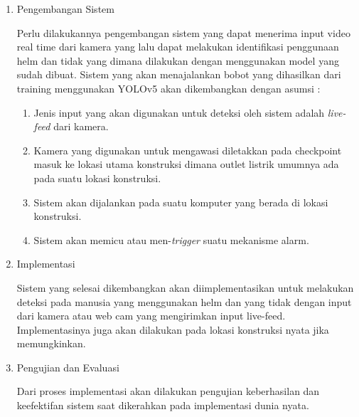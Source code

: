 \begin{enumerate}
  \item Pengembangan Sistem
  \par Perlu dilakukannya pengembangan sistem yang dapat menerima input video real time dari kamera yang lalu dapat melakukan identifikasi penggunaan helm dan tidak yang dimana dilakukan
  dengan menggunakan model yang sudah dibuat. Sistem yang akan menajalankan bobot yang dihasilkan dari training menggunakan YOLOv5 akan dikembangkan dengan asumsi :
  \begin{enumerate}
    \item Jenis input yang akan digunakan untuk deteksi oleh sistem adalah \emph{live-feed} dari kamera.
    \item Kamera yang digunakan untuk mengawasi diletakkan pada checkpoint masuk ke lokasi utama konstruksi dimana outlet listrik umumnya ada pada suatu lokasi konstruksi.
    \item Sistem akan dijalankan pada suatu komputer yang berada di lokasi konstruksi.
    \item Sistem akan memicu atau men-\emph{trigger} suatu mekanisme alarm.
  \end{enumerate} 

  \item Implementasi
  \par Sistem yang selesai dikembangkan akan diimplementasikan untuk melakukan deteksi pada manusia yang menggunakan helm dan yang tidak dengan input dari kamera atau web cam yang mengirimkan input live-feed.
  Implementasinya juga akan dilakukan pada lokasi konstruksi nyata jika memungkinkan.

  \item Pengujian dan Evaluasi
  \par Dari proses implementasi akan dilakukan pengujian keberhasilan dan keefektifan sistem saat dikerahkan pada implementasi dunia nyata.

\end{enumerate}





% 

